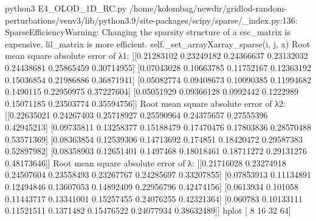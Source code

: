 python3 E4_OLOD_1D_RC.py
/home/kolombag/newdir/gridlod-random-perturbations/venv3/lib/python3.9/site-packages/scipy/sparse/_index.py:136: SparseEfficiencyWarning: Changing the sparsity structure of a csc_matrix is expensive. lil_matrix is more efficient.
  self._set_arrayXarray_sparse(i, j, x)
Root mean square absolute error of λ1:
 [[0.21283102 0.23249182 0.24366637 0.23132032 0.24438681 0.25865459
  0.30714955]
 [0.07043028 0.10663785 0.11752167 0.12363192 0.15036854 0.21986886
  0.36871941]
 [0.05082774 0.09408673 0.10090385 0.11994682 0.1490115  0.22950975
  0.37227604]
 [0.05051929 0.09366128 0.0992442  0.1222989  0.15071185 0.23503774
  0.35594756]]
Root mean square absolute error of λ2: 
 [[0.22635021 0.24267403 0.25718927 0.25590964 0.24375657 0.27555396
  0.42945213]
 [0.09735811 0.13258377 0.15188479 0.17470476 0.17803836 0.28570488
  0.53571369]
 [0.08363854 0.12539306 0.14713692 0.174851   0.18420472 0.29587383
  0.52897982]
 [0.08358903 0.12651401 0.1497468  0.18018461 0.18711272 0.29131276
  0.48173646]]
Root mean square absolute error of λ: 
 [[0.21716028 0.23274918 0.24507604 0.23558493 0.23267767 0.24285697
  0.33207855]
 [0.07853913 0.11134891 0.12494846 0.13607053 0.14892409 0.22956796
  0.42474156]
 [0.0613934  0.101058   0.11443717 0.13341001 0.15257455 0.24076255
  0.42321364]
 [0.060783   0.10133111 0.11521511 0.1371482  0.15476522 0.24077934
  0.38632489]]
hplot [ 8 16 32 64]